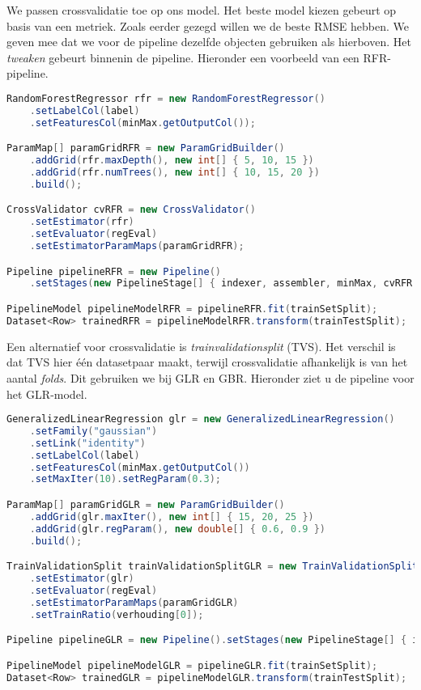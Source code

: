 \documentclass[a4paper,10pt,twoside]{report}
\begin{document}
We passen crossvalidatie toe op ons model. Het beste model kiezen gebeurt op basis van een metriek. Zoals eerder gezegd willen we de beste RMSE hebben. We geven mee dat we voor de pipeline dezelfde objecten gebruiken als hierboven. Het \textit{tweaken} gebeurt binnenin de pipeline. Hieronder een voorbeeld van een RFR-pipeline.

\begin{lstlisting}[language=Java]
RandomForestRegressor rfr = new RandomForestRegressor()
	.setLabelCol(label)
	.setFeaturesCol(minMax.getOutputCol());

ParamMap[] paramGridRFR = new ParamGridBuilder()
	.addGrid(rfr.maxDepth(), new int[] { 5, 10, 15 })
	.addGrid(rfr.numTrees(), new int[] { 10, 15, 20 })
	.build();

CrossValidator cvRFR = new CrossValidator()
	.setEstimator(rfr)
	.setEvaluator(regEval)
	.setEstimatorParamMaps(paramGridRFR);

Pipeline pipelineRFR = new Pipeline()
	.setStages(new PipelineStage[] { indexer, assembler, minMax, cvRFR });

PipelineModel pipelineModelRFR = pipelineRFR.fit(trainSetSplit);
Dataset<Row> trainedRFR = pipelineModelRFR.transform(trainTestSplit);
\end{lstlisting}

Een alternatief voor crossvalidatie is \textit{trainvalidationsplit} (TVS). Het verschil is dat TVS hier één datasetpaar maakt, terwijl crossvalidatie afhankelijk is van het aantal \textit{folds}. Dit gebruiken we bij GLR en GBR. Hieronder ziet u de pipeline voor het GLR-model.

\begin{lstlisting}[language=Java]
GeneralizedLinearRegression glr = new GeneralizedLinearRegression()
	.setFamily("gaussian")
	.setLink("identity")
	.setLabelCol(label)
	.setFeaturesCol(minMax.getOutputCol())
	.setMaxIter(10).setRegParam(0.3);

ParamMap[] paramGridGLR = new ParamGridBuilder()
	.addGrid(glr.maxIter(), new int[] { 15, 20, 25 })
	.addGrid(glr.regParam(), new double[] { 0.6, 0.9 })
	.build();

TrainValidationSplit trainValidationSplitGLR = new TrainValidationSplit()
	.setEstimator(glr)
	.setEvaluator(regEval)
	.setEstimatorParamMaps(paramGridGLR)
	.setTrainRatio(verhouding[0]);

Pipeline pipelineGLR = new Pipeline().setStages(new PipelineStage[] { indexer, assembler, minMax, trainValidationSplitGLR});

PipelineModel pipelineModelGLR = pipelineGLR.fit(trainSetSplit);
Dataset<Row> trainedGLR = pipelineModelGLR.transform(trainTestSplit);
\end{lstlisting}
\end{document}
